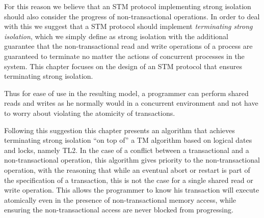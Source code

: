 For this reason we believe that an STM protocol implementing strong
isolation should also consider the progress of non-transactional operations.
In order to deal with this we suggest that a STM protocol should implement
\emph{terminating strong isolation}, which we simply define as strong isolation
with the additional guarantee that the non-transactional read and write
operations of a process are guaranteed to terminate no matter the actions of
concurrent processes in the system.
This chapter focuses on the design of an STM protocol
that ensures terminating strong isolation.






Thus for ease of use in the resulting model, a programmer can perform shared reads and writes
as he normally would in a concurrent environment and not have to worry
about violating the atomicity of transactions.

Following this suggestion this chapter presents an algorithm that achieves terminating strong 
isolation  ``on top of'' a TM algorithm based on logical dates and locks, 
namely  TL2. 
In the case of a conflict between a transactional and a non-transactional
operation, this algorithm gives priority to 
the non-transactional operation, 
with the reasoning that while an eventual abort or restart is part of the 
specification of a transaction,
this is not the case for a single shared read or write operation. 
This allows the programmer to know his transaction will execute atomically even
in the presence of non-transactional memory access, while ensuring the non-transactional
access are never blocked from progressing.

